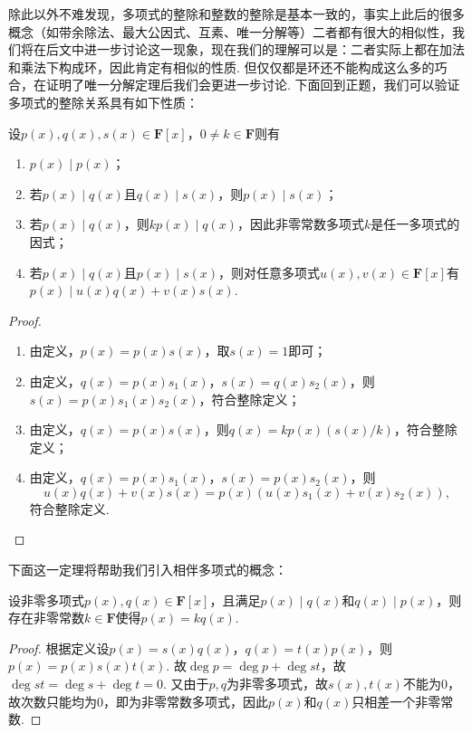 除此以外不难发现，多项式的整除和整数的整除是基本一致的，事实上此后的很多概念（如带余除法、最大公因式、互素、唯一分解等）二者都有很大的相似性，我们将在后文中进一步讨论这一现象，现在我们的理解可以是：二者实际上都在加法和乘法下构成环，因此肯定有相似的性质. 但仅仅都是环还不能构成这么多的巧合，在证明了唯一分解定理后我们会更进一步讨论. 下面回到正题，我们可以验证多项式的整除关系具有如下性质：
\begin{theorem}{}{}
    设$p(x),q(x),s(x)\in\mathbf{F}[x]$，$0\neq k\in\mathbf{F}$则有
    \begin{enumerate}
        \item $p(x)\mid p(x)$；
        \item 若$p(x)\mid q(x)$且$q(x)\mid s(x)$，则$p(x)\mid s(x)$；
        \item 若$p(x)\mid q(x)$，则$kp(x)\mid q(x)$，因此非零常数多项式$k$是任一多项式的因式；
        \item 若$p(x)\mid q(x)$且$p(x)\mid s(x)$，则对任意多项式$u(x),v(x)\in\mathbf{F}[x]$有$p(x)\mid u(x)q(x)+v(x)s(x)$.
    \end{enumerate}
\end{theorem}
\begin{proof}
    \begin{enumerate}
        \item 由定义，$p(x)=p(x)s(x)$，取$s(x)=1$即可；
        \item 由定义，$q(x)=p(x)s_1(x)$，$s(x)=q(x)s_2(x)$，则$s(x)=p(x)s_1(x)s_2(x)$，符合整除定义；
        \item 由定义，$q(x)=p(x)s(x)$，则$q(x)=kp(x)(s(x)/k)$，符合整除定义；
        \item 由定义，$q(x)=p(x)s_1(x)$，$s(x)=p(x)s_2(x)$，则
              \[u(x)q(x)+v(x)s(x)=p(x)(u(x)s_1(x)+v(x)s_2(x)),\]
              符合整除定义.
    \end{enumerate}
\end{proof}

下面这一定理将帮助我们引入相伴多项式的概念：
\begin{theorem}{}{}
    设非零多项式$p(x),q(x)\in\mathbf{F}[x]$，且满足$p(x)\mid q(x)$和$q(x)\mid p(x)$，则存在非零常数$k\in\mathbf{F}$使得$p(x)=kq(x)$.
\end{theorem}
\begin{proof}
    根据定义设$p(x)=s(x)q(x)$，$q(x)=t(x)p(x)$，则$p(x)=p(x)s(x)t(x)$. 故$\deg p=\deg p+\deg st$，故$\deg st=\deg s+\deg t=0$. 又由于$p,q$为非零多项式，故$s(x),t(x)$不能为$0$，故次数只能均为$0$，即为非零常数多项式，因此$p(x)$和$q(x)$只相差一个非零常数.
\end{proof}

